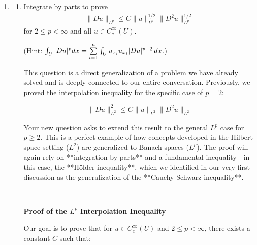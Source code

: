 \documentclass[12pt,a4paper]{report}
\begin{document}
\begin{enumerate}
\HLINE

\newpage
\item \begin{enumerate}
	\item Integrate by parts to prove 
	\begin{align*}
		\|Du\|_{L^p} \le C\|u\|_{L^p}^{1/2}\|D^2u\|_{L^p}^{1/2}
	\end{align*}for $2\le p < \infty$ and all $u \in C_c^\infty(U)$.
	
	(Hint: $\int_U |Du|^p dx = \underset{i=1}{\overset{n}{\sum}} \int_U u_{x_i}u_{x_i}|Du|^{p-2}\,dx$.)

\HLINE	
	This question is a direct generalization of a problem we have already solved and is deeply connected to our entire conversation. Previously, we proved the interpolation inequality for the specific case of $p=2$:

$$ \|Du\|_{L^2}^2 \le C\|u\|_{L^2}\|D^2u\|_{L^2} $$

Your new question asks to extend this result to the general $L^p$ case for $p \ge 2$. This is a perfect example of how concepts developed in the Hilbert space setting ($L^2$) are generalized to Banach spaces ($L^p$). The proof will again rely on **integration by parts** and a fundamental inequality—in this case, the **Hölder inequality**, which we identified in our very first discussion as the generalization of the **Cauchy-Schwarz inequality**.

---

\textbf{Proof of the $L^p$ Interpolation Inequality}

Our goal is to prove that for $u \in C_c^\infty(U)$ and $2 \le p < \infty$, there exists a constant $C$ such that:


\end{enumerate}
\end{enumerate}
\end{document}
